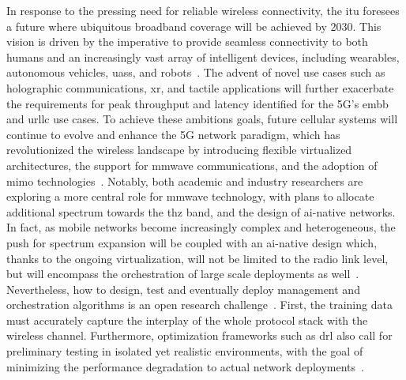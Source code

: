 In response to the pressing need for reliable wireless connectivity, the \gls{itu} foresees a future where ubiquitous broadband coverage will be achieved by 2030. This vision is driven by the imperative to provide seamless connectivity to both humans and an increasingly vast array of intelligent devices, including wearables, autonomous vehicles, \glspl{uas}, and robots~\cite{mozaffari2018beyond}.
The advent of novel use cases such as holographic communications, \gls{xr}, and tactile applications will further exacerbate the requirements for peak throughput and latency identified for the 5G's \gls{embb} and \gls{urllc} use cases. 
To achieve these ambitions goals, future cellular systems will continue to evolve and enhance the 5G network paradigm, which has revolutionized the wireless landscape by introducing flexible virtualized architectures, the support for \gls{mmwave} communications, and the adoption of \gls{mimo} technologies~\cite{ghosh20195g}. 
Notably, both academic and industry researchers are exploring a more central role for \gls{mmwave} technology, with plans to allocate additional spectrum towards the \gls{thz} band, and the design of \gls{ai}-native networks.
In fact, as mobile networks become increasingly complex and heterogeneous, the push for spectrum expansion will be coupled with an \gls{ai}-native design which, thanks to the ongoing virtualization, will not be limited to the radio link level, but will encompass the orchestration of large scale deployments as well~\cite{polese2023understanding}.
Nevertheless, how to design, test and eventually deploy management and orchestration algorithms is an open research challenge~\cite{polese2022colo}.
First, the training data must accurately capture the interplay of the whole protocol stack with the wireless channel. Furthermore, optimization frameworks such as \gls{drl} also call for preliminary testing in isolated yet realistic environments, with the goal of minimizing the performance degradation to actual network deployments~\cite{lacava2022programmable, amir2023safehaul}.

